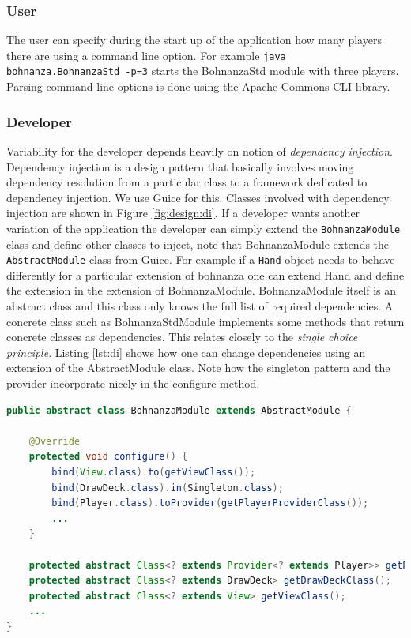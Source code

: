 \subsubsection{User}
The user can specify during the start up of the application how many players there are using a
command line option. For example \texttt{java bohnanza.BohnanzaStd -p=3} starts the BohnanzaStd
module with three players. Parsing command line options is done using the Apache Commons CLI library.

\subsubsection{Developer}
Variability for the developer depends heavily on notion of \emph{dependency injection}. Dependency
injection is a design pattern that basically involves moving dependency resolution from a particular
class to a framework dedicated to dependency injection. We use Guice for this. Classes involved with dependency injection are shown in
Figure \ref{fig:design:di}. If a developer wants another variation of the application the developer can simply extend the
\texttt{BohnanzaModule} class and define other classes to inject, note that BohnanzaModule
extends the \texttt{AbstractModule} class from Guice. For example if a \texttt{Hand} object needs
to behave differently for a particular extension of bohnanza one can extend Hand and
define the extension in the extension of BohnanzaModule. BohnanzaModule itself is
an abstract class and this class only knows the full list of required dependencies. A concrete class
such as BohnanzaStdModule implements some methods that return concrete classes as
dependencies. This relates closely to the \emph{single choice principle}. Listing \ref{lst:di} shows how one can change dependencies using
an extension of the AbstractModule class. Note how the singleton pattern and the provider incorporate nicely in the configure method.

\begin{lstlisting}[language=Java, caption=BohnanzaModule.java, label=lst:di]
public abstract class BohnanzaModule extends AbstractModule {

    @Override
    protected void configure() {
        bind(View.class).to(getViewClass());
        bind(DrawDeck.class).in(Singleton.class);
        bind(Player.class).toProvider(getPlayerProviderClass());
        ...
    }

    protected abstract Class<? extends Provider<? extends Player>> getPlayerProviderClass();
    protected abstract Class<? extends DrawDeck> getDrawDeckClass();
    protected abstract Class<? extends View> getViewClass();    
    ...
}
\end{lstlisting}

